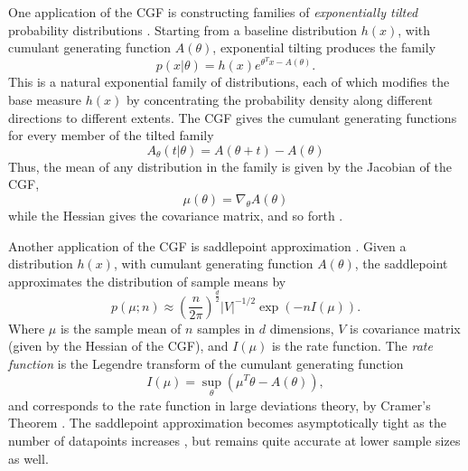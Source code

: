 \documentclass[11pt]{article}      %
\begin{document}
One application of the CGF is constructing families of \textit{exponentially tilted} probability distributions \cite{morris_natural_1982,morris_unifying_2009}.
Starting from a baseline distribution $h(x)$, with cumulant generating function $A(\theta)$, exponential tilting produces the family
\begin{equation}
  p(x | \theta) = h(x) e^{\theta^T x - A(\theta)}. \label{def:exponential_tilt}
\end{equation}
This is a natural exponential family of distributions, each of which modifies the base measure $h(x)$ by concentrating the probability density along different directions to different extents.
The CGF gives the cumulant generating functions for every member of the tilted family
\begin{equation}
  A_\theta(t | \theta) = A(\theta + t) - A(\theta) \label{eq:CGF_family}
\end{equation}
Thus, the mean of any distribution in the family is given by the Jacobian of the CGF,
\begin{equation}
  \mu(\theta) = \nabla_\theta A(\theta) \label{eq:cgf_jacobian}
\end{equation}
while the Hessian gives the covariance matrix, and so forth \cite{barndorff2014information}.

Another application of the CGF is saddlepoint approximation \cite{daniels_saddlepoint_1954,barndorff-nielsen_edgeworth_1979}.
Given a distribution $h(x)$, with cumulant generating function $A(\theta)$, the saddlepoint approximates the distribution of sample means by
\begin{equation}
  p(\mu; n) \approx \left( \frac{n}{2\pi} \right)^{\frac{d}{2}} |V|^{-1/2} \exp(-n I(\mu)). \label{def:mean_density}
\end{equation}
Where $\mu$ is the sample mean of $n$ samples in $d$ dimensions, $V$ is covariance matrix (given by the Hessian of the CGF), and $I(\mu)$ is the rate function.
The \textit{rate function} is the Legendre transform of the cumulant generating function
\begin{equation}
  I(\mu) = \sup_{\theta}(\mu^T \theta  - A(\theta) ), \label{eq:legendre_transform}
\end{equation}
and corresponds to the rate function in large deviations theory, by Cramer's Theorem \cite{dembo2009large}.
The saddlepoint approximation becomes asymptotically tight as the number of datapoints increases \cite{iltis_sharp_1995,chaganty_multidimensional_1986}, but remains quite accurate at lower sample sizes \cite{davison_saddlepoint_1988,ronchetti_empirical_1994} as well.
\end{document}

